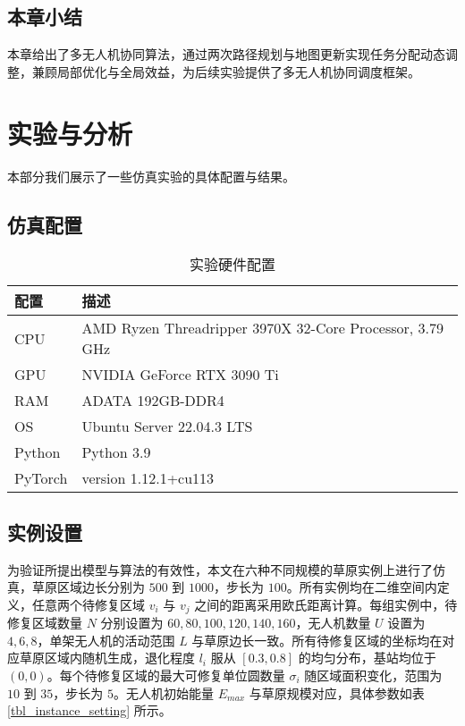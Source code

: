 \documentclass[AutoFakeBold]{LZUThesis}
\begin{document}
\section{本章小结}
本章给出了多无人机协同算法，通过两次路径规划与地图更新实现任务分配动态调整，兼顾局部优化与全局效益，为后续实验提供了多无人机协同调度框架。

\chapter{实验与分析}
本部分我们展示了一些仿真实验的具体配置与结果。
\label{sub:实验配置表格}
\section{仿真配置}
\begin{table}[H]
	\centering
	\caption{实验硬件配置}
	\begin{tabular}{ll} %
		\toprule
		配置      & 描述                                                       \\
		\midrule
		CPU     & AMD Ryzen Threadripper 3970X 32-Core Processor, 3.79 GHz \\
		GPU     & NVIDIA GeForce RTX 3090 Ti                               \\
		RAM     & ADATA 192GB-DDR4                                         \\
		OS      & Ubuntu Server 22.04.3 LTS                                \\
		Python  & Python 3.9                                               \\
		PyTorch & version 1.12.1+cu113                                     \\
		\bottomrule
	\end{tabular}
	\label{tbl_hardware_config}
\end{table}
\section{实例设置}
为验证所提出模型与算法的有效性，本文在六种不同规模的草原实例上进行了仿真，草原区域边长分别为 $500$ 到 $1000$，步长为 $100$。所有实例均在二维空间内定义，任意两个待修复区域 $v_i$ 与 $v_j$ 之间的距离采用欧氏距离计算。每组实例中，待修复区域数量 $N$ 分别设置为 $60, 80, 100, 120, 140, 160$，无人机数量 $U$ 设置为 $4, 6, 8$，单架无人机的活动范围 $L$ 与草原边长一致。所有待修复区域的坐标均在对应草原区域内随机生成，退化程度 $l_i$ 服从 $[0.3, 0.8]$ 的均匀分布，基站均位于 $(0,0)$。每个待修复区域的最大可修复单位圆数量 $\sigma_i$ 随区域面积变化，范围为 $10$ 到 $35$，步长为 $5$。无人机初始能量 $E_{max}$ 与草原规模对应，具体参数如表\ref{tbl_instance_setting} 所示。
\end{document}
